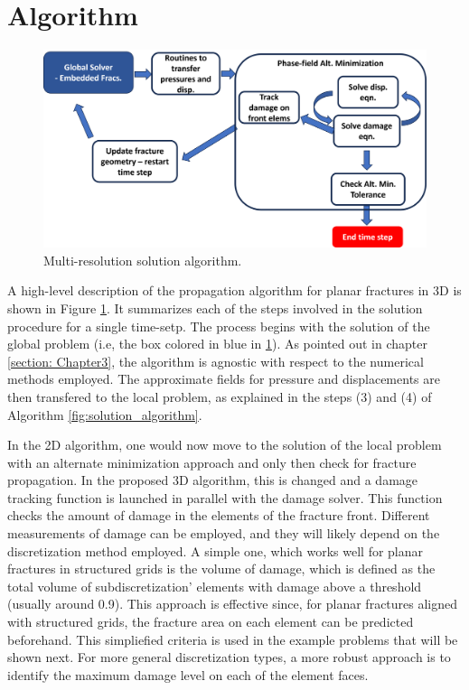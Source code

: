 \section{Algorithm}
\label{section: Chapter4/algo}

\begin{figure}[h]
    \centering
    \includegraphics[width=\linewidth]{Chapter4/figures/planar3D_algorithm.png}
    \caption{Multi-resolution solution algorithm.}
    \label{fig:MR_planar_algo}
\end{figure}

A high-level description of the propagation algorithm for planar fractures in 3D is shown in Figure \ref{fig:MR_planar_algo}. It summarizes each of the steps involved in the solution procedure for a single time-setp. The process begins with the solution of the global problem (i.e, the box colored in blue in \ref{fig:MR_planar_algo}). As pointed out in chapter \ref{section: Chapter3}, the algorithm is agnostic with respect to the numerical methods employed. The approximate fields for pressure and displacements are then transfered to the local problem, as explained in the steps (3) and (4) of Algorithm \ref{fig:solution_algorithm}.

In the 2D algorithm, one would now move to the solution of the local problem with an alternate minimization approach and only then check for fracture propagation. In the proposed 3D algorithm, this is changed and a damage tracking function is launched in parallel with the damage solver. This function checks the amount of damage in the elements of the fracture front. Different measurements of damage can be employed, and they will likely depend on the discretization method employed. A simple one, which works well for planar fractures in structured grids is the volume of damage, which is defined as the total volume of subdiscretization' elements with damage above a threshold (usually around 0.9). This approach is effective since, for planar fractures aligned with structured grids, the fracture area on each element can be predicted beforehand. This simpliefied criteria is used in the example problems that will be shown next. For more general discretization types, a more robust approach is to identify the maximum damage level on each of the element faces. 

